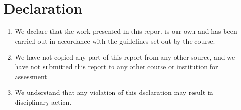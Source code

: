 \section*{Declaration}
\begin{enumerate}
    \item We declare that the work presented in this report is our own and has been carried out in accordance with the guidelines set out by the course. 
    \item We have not copied any part of this report from any other source, and we have not submitted this report to any other course or institution for assessment.
    \item We understand that any violation of this declaration may result in disciplinary action.
\end{enumerate}